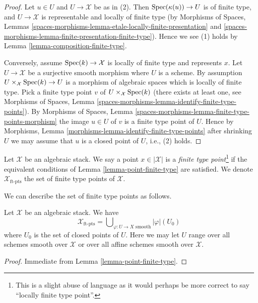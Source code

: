 \begin{proof}
Let $u \in U$ and $U \to \mathcal{X}$ be as in (2). Then
$\mathop{\rm Spec}(\kappa(u)) \to U$ is of finite type, and $U \to \mathcal{X}$ is
representable and locally of finite type (by
Morphisms of Spaces,
Lemmas \ref{spaces-morphisms-lemma-etale-locally-finite-presentation} and
\ref{spaces-morphisms-lemma-finite-presentation-finite-type}).
Hence we see (1) holds by
Lemma \ref{lemma-composition-finite-type}.

\medskip\noindent
Conversely, assume $\mathop{\rm Spec}(k) \to \mathcal{X}$ is locally of finite type
and represents $x$. Let $U \to \mathcal{X}$ be a surjective smooth morphism
where $U$ is a scheme. By assumption
$U \times_\mathcal{X} \mathop{\rm Spec}(k) \to U$ is a morphism of algebraic
spaces which is locally of finite type. Pick a finite type point $v$ of
$U \times_\mathcal{X} \mathop{\rm Spec}(k)$ (there exists at least one, see
Morphisms of Spaces,
Lemma \ref{spaces-morphisms-lemma-identify-finite-type-points}).
By
Morphisms of Spaces,
Lemma \ref{spaces-morphisms-lemma-finite-type-points-morphism}
the image $u \in U$ of $v$ is a finite type point of $U$.
Hence by
Morphisms, Lemma \ref{morphisms-lemma-identify-finite-type-points}
after shrinking $U$ we may assume that $u$ is a closed point of $U$, i.e.,
(2) holds.
\end{proof}

\begin{definition}
\label{definition-finite-type-point}
Let $\mathcal{X}$ be an algebraic stack. We say a point $x \in |\mathcal{X}|$
is a {\it finite type point}\footnote{This is a
slight abuse of language as it would perhaps be more correct to say
``locally finite type point''.} if the equivalent conditions of
Lemma \ref{lemma-point-finite-type}
are satisfied. We denote $\mathcal{X}_{\text{ft-pts}}$
the set of finite type points of $\mathcal{X}$.
\end{definition}

\noindent
We can describe the set of finite type points as follows.

\begin{lemma}
\label{lemma-identify-finite-type-points}
Let $\mathcal{X}$ be an algebraic stack. We have
$$
\mathcal{X}_{\text{ft-pts}} =
\bigcup\nolimits_{\varphi : U \to X\text{ smooth}} |\varphi|(U_0)
$$
where $U_0$ is the set of closed points of $U$.
Here we may let $U$ range over all schemes smooth over $\mathcal{X}$
or over all affine schemes smooth over $\mathcal{X}$.
\end{lemma}

\begin{proof}
Immediate from
Lemma \ref{lemma-point-finite-type}.
\end{proof}

